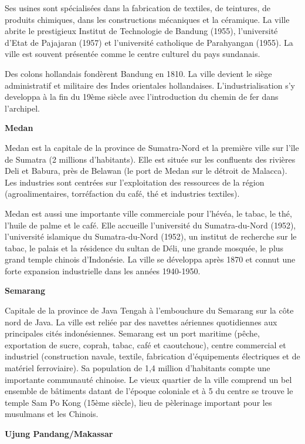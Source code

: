 \begin{multicols}{2}
Ses usines sont spécialisées dans la fabrication de textiles, de teintures, de produits chimiques, dans les constructions mécaniques et la céramique. La ville abrite le prestigieux Institut de Technologie de Bandung (1955), l'université d'Etat de Pajajaran (1957) et l'université catholique de Parahyangan (1955). La ville est souvent présentée comme le centre culturel du pays sundanais.

Des colons hollandais fondèrent Bandung en 1810. La ville devient le siège administratif et militaire des Indes orientales hollandaises. L'industrialisation s'y developpa à la fin du 19ème siècle avec l'introduction du chemin de fer dans l'archipel.

\textbf{Medan}

Medan est la capitale de la province de Sumatra-Nord et la première ville sur l'île de Sumatra (2 millions d'habitants). Elle est située sur les confluents des rivières Deli et Babura, près de Belawan (le port de Medan sur le détroit de Malacca). Les industries sont centrées sur l'exploitation des ressources de la région (agroalimentaires, torréfaction du café, thé et industries textiles).

Medan est aussi une importante ville commerciale pour l'hévéa, le tabac, le thé, l'huile de palme et le café. Elle accueille l'université du Sumatra-du-Nord (1952), l'université islamique du Sumatra-du-Nord (1952), un institut de recherche sur le tabac, le palais et la résidence du sultan de Déli, une grande mosquée, le plus grand temple chinois d'Indonésie. La ville se développa après 1870 et connut une forte expansion industrielle dans les années 1940-1950.

\textbf{Semarang}

Capitale de la province de Java Tengah à l'embouchure du Semarang sur la côte nord de Java. La ville est reliée par des navettes aériennes quotidiennes aux principales cités indonésiennes. Semarang est un port maritime (pêche, exportation de sucre, coprah, tabac, café et caoutchouc), centre commercial et industriel (construction navale, textile, fabrication d'équipements électriques et de matériel ferroviaire). Sa population de 1,4 million d'habitants compte une importante communauté chinoise. Le vieux quartier de la ville comprend un bel ensemble de bâtiments datant de l'époque coloniale et à 5 \kilo\meter du centre se trouve le temple Sam Po Kong (15ème siècle), lieu de pèlerinage important pour les musulmans et les Chinois.

\textbf{Ujung Pandang/Makassar}


\end{multicols}
